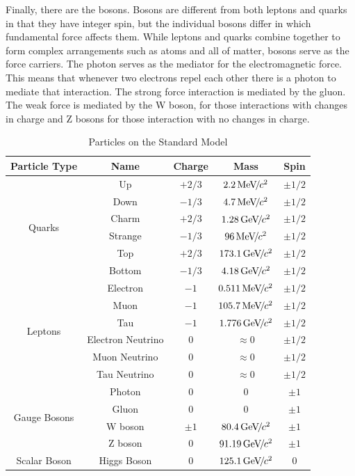 Finally, there are the bosons. Bosons are different from both leptons and quarks in that they have integer spin, but the individual bosons differ in which fundamental force affects them. While leptons and quarks combine together to form complex arrangements such as atoms and all of matter, bosons serve as the force carriers. The photon serves as the mediator for the electromagnetic force. This means that whenever two electrons repel each other there is a photon to mediate that interaction. The strong force interaction is mediated by the gluon. The weak force is mediated by the W boson, for those interactions with changes in charge and Z bosons for those interaction with no changes in charge. 

\begin{table}
\caption{Particles on the Standard Model}
\label{tab:particles}
\begin{center}
\begin{tabular}{|c|c|c|c|c|}
\hline
Particle Type & Name & Charge & Mass & Spin \\
\hline
\multirow{6}{*}{Quarks} & Up & $+2/3$ & $2.2{\,\text{Me\hspace{-.08em}V\hspace{-0.16em}/\hspace{-0.08em}}c^\text{2}}$ & $\pm 1/2$ \\
& Down & $-1/3$ & $4.7{\,\text{Me\hspace{-.08em}V\hspace{-0.16em}/\hspace{-0.08em}}c^\text{2}}$ & $\pm 1/2$ \\
& Charm & $+2/3$ & $1.28{\,\text{Ge\hspace{-.08em}V\hspace{-0.16em}/\hspace{-0.08em}}c^\text{2}}$ & $\pm 1/2$ \\
& Strange & $-1/3$ & $96{\,\text{Me\hspace{-.08em}V\hspace{-0.16em}/\hspace{-0.08em}}c^\text{2}}$ & $\pm 1/2$ \\
& Top & $+2/3$ & $173.1{\,\text{Ge\hspace{-.08em}V\hspace{-0.16em}/\hspace{-0.08em}}c^\text{2}}$ & $\pm 1/2$ \\
& Bottom & $-1/3$ & $4.18{\,\text{Ge\hspace{-.08em}V\hspace{-0.16em}/\hspace{-0.08em}}c^\text{2}}$ & $\pm 1/2$ \\
\hline
\multirow{6}{*}{Leptons} & Electron & $-1$ & $0.511{\,\text{Me\hspace{-.08em}V\hspace{-0.16em}/\hspace{-0.08em}}c^\text{2}}$ & $\pm 1/2$ \\
& Muon & $-1$ & $105.7{\,\text{Me\hspace{-.08em}V\hspace{-0.16em}/\hspace{-0.08em}}c^\text{2}}$ & $\pm 1/2$ \\
& Tau & $-1$ & $1.776{\,\text{Ge\hspace{-.08em}V\hspace{-0.16em}/\hspace{-0.08em}}c^\text{2}}$ & $\pm 1/2$ \\
& Electron Neutrino & $0$ & $\approx 0$ & $\pm 1/2$ \\
& Muon Neutrino & $0$ & $\approx 0$ & $\pm 1/2$ \\
& Tau Neutrino & $0$ & $\approx 0$ & $\pm 1/2$ \\
\hline
\multirow{4}{*}{Gauge Bosons} & Photon & 0 & 0 & $\pm 1$ \\
& Gluon & 0 & 0 & $\pm 1$ \\
& W boson & $\pm 1$ & $80.4{\,\text{Ge\hspace{-.08em}V\hspace{-0.16em}/\hspace{-0.08em}}c^\text{2}}$ & $\pm 1$ \\
& Z boson & 0 & $91.19{\,\text{Ge\hspace{-.08em}V\hspace{-0.16em}/\hspace{-0.08em}}c^\text{2}}$ & $\pm 1$ \\
\hline
Scalar Boson & Higgs Boson & 0 & $125.1{\,\text{Ge\hspace{-.08em}V\hspace{-0.16em}/\hspace{-0.08em}}c^\text{2}}$ & 0 \\
\hline
\end{tabular}
\end{center}
\end{table} 
